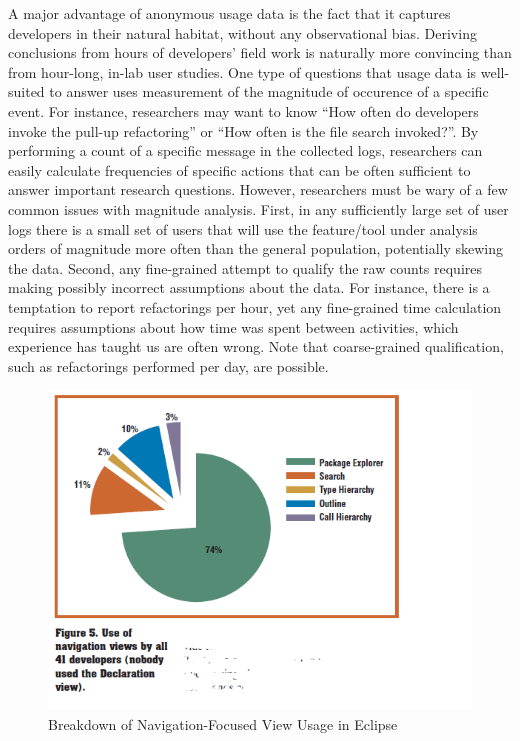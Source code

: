 A major advantage of anonymous usage data is the fact that it captures developers in their natural habitat, without any observational bias. Deriving conclusions from hours of developers' field work is naturally more convincing than from hour-long, in-lab user studies. One type of questions that usage data is well-suited to answer uses measurement of the magnitude of occurence of a specific event. For instance, researchers may want to know ``How often do developers invoke the pull-up refactoring'' or ``How often is the file search invoked?''. By performing a count of a specific message in the collected logs, researchers can easily calculate frequencies of specific actions that can be often sufficient to answer important research questions. However, researchers must be wary of a few common issues with magnitude analysis. First, in any sufficiently large set of user logs there is a small set of users that will use the feature/tool under analysis orders of magnitude more often than the general population, potentially skewing the data. Second, any fine-grained attempt to qualify the raw counts requires making possibly incorrect assumptions about the data. For instance, there is a temptation to report refactorings per hour, yet any fine-grained time calculation requires assumptions about how time was spent between activities, which experience has taught us are often wrong. Note that coarse-grained qualification, such as refactorings performed per day, are possible.   

\begin{figure}
  \centering
  \includegraphics{AnalyzingUsageData/eclipse}
  \caption{Breakdown of Navigation-Focused View Usage in Eclipse}\label{fig:eclipse}
\end{figure}


